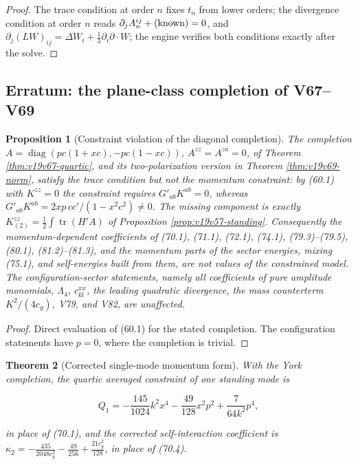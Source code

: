 \documentclass[11pt]{article}
\newtheorem{theorem}{Theorem}[section]
\newtheorem{proposition}[theorem]{Proposition}
\theoremstyle{remark}
\begin{document}
\begin{proof}
The trace condition at order \(n\) fixes \(t_n\) from lower orders;
the divergence condition at order \(n\) reads
\(\partial_jA_n^{ij}+(\hbox{known})=0\), and
\(\partial_j(LW)_{ij}=\Delta W_i+\tfrac13\partial_i\partial\cdot W\);
the engine verifies both conditions exactly after the solve.
\end{proof}

\subsection{Erratum: the plane-class completion of V67--V69}

\begin{proposition}[Constraint violation of the diagonal completion]
\label{prop:v19v83-erratum}
The completion \(A=\operatorname{diag}(pc(1+xc),-pc(1-xc))\),
\(A^{zz}=A^{za}=0\), of Theorem \ref{thm:v19v67-quartic}, and its
two-polarization version in Theorem \ref{thm:v19v69-norm}, satisfy
the trace condition but not the momentum constraint: by (60.1) with
\(K^{zz}=0\) the constraint requires \(G'_{ab}K^{ab}=0\), whereas
\(G'_{ab}K^{ab}=2xp\,cc'/(1-x^2c^2)\neq0\).  The missing component is
exactly \(K^{zz}_{(2)}=\tfrac12\int\operatorname{tr}(H'A)\) of
Proposition \ref{prop:v19v57-standing}.  Consequently the
momentum-dependent coefficients of (70.1), (71.1), (72.1), (74.1),
(79.3)--(79.5), (80.1), (81.2)--(81.3), and the momentum parts of the
sector energies, mixing (75.1), and self-energies built from them,
are not values of the constrained model.  The configuration-sector
statements, namely all coefficients of pure amplitude monomials,
\(\Lambda_4\), \(c^{xx}_{kl}\), the leading quadratic divergence, the
mass counterterm \(K^2/(4c_g)\), V79, and V82, are unaffected.
\end{proposition}

\begin{proof}
Direct evaluation of (60.1) for the stated completion.  The
configuration statements have \(p=0\), where the completion is
trivial.
\end{proof}

\begin{theorem}[Corrected single-mode momentum form]
\label{thm:v19v83-single}
With the York completion, the quartic averaged constraint of one
standing mode is

\[
 Q_1=-\frac{145}{1024}k^2x^4-\frac{49}{128}x^2p^2+\frac{7}{64k^2}p^4,
                                                                    \tag{86.1}
\]

in place of (70.1), and the corrected self-interaction coefficient is
\(\kappa_2=-\tfrac{435}{2048c_g^2}-\tfrac{49}{256}+\tfrac{21c_g^2}{128}\),
in place of (70.4).
\end{theorem}
\end{document}
